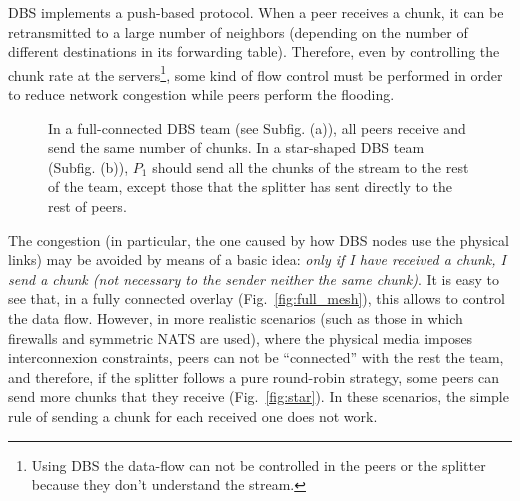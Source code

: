 

\label{sec:chunk_flooding}

\begin{comment}
\begin{figure*}
  \imgw{300}{graphics/peer_chunk_flooding.svg}
  \caption{Chunk flooding at peers.\label{fig:peer_chunk_flooding}}
\end{figure*}
\end{comment}

DBS implements a push-based protocol. When a peer receives a chunk, it
can be retransmitted to a large number of neighbors (depending on the
number of different destinations in its forwarding table). Therefore,
even by controlling the chunk rate at the servers\footnote{Using DBS
  the data-flow can not be controlled in the peers or the splitter
  because they don't understand the stream.}, some kind of flow
control must be performed in order to reduce network congestion while
peers perform the flooding.


\begin{figure*}
  \centering
  \quad
  \caption{In a full-connected DBS team (see Subfig. (a)), all peers
    receive and send the same number of chunks. In a star-shaped DBS
    team (Subfig. (b)), $P_1$ should send all the chunks of the stream
    to the rest of the team, except those that the splitter has sent
    directly to the rest of peers.}
\end{figure*}

The congestion (in particular, the one caused by how DBS nodes use the
physical links) may be avoided by means of a basic idea: \textit{only
  if I have received a chunk, I send a chunk (not necessary to the
  sender neither the same chunk)}. It is easy to see that, in a fully
connected overlay (Fig.~\ref{fig:full_mesh}), this allows to control
the data flow. However, in more realistic scenarios (such as those in
which firewalls and symmetric NATS are used), where the physical media
imposes interconnexion constraints, peers can not be ``connected''
with the rest the team, and therefore, if the splitter follows a pure
round-robin strategy, some peers can send more chunks that they
receive (Fig.~\ref{fig:star}). In these scenarios, the simple
rule of sending a chunk for each received one does not work.

